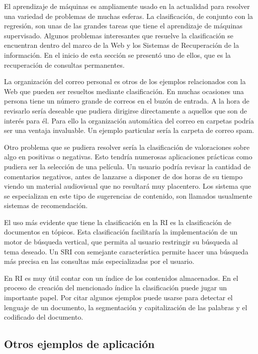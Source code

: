 \documentclass{llncs}
\begin{document}
	{\tiny 	El aprendizaje de m\'aquinas es ampliamente usado en la actualidad para resolver una variedad de problemas de muchas esferas. La clasificaci\'on, de conjunto con la regresi\'on, son unas de las grandes tareas que tiene el aprendizaje de m\'aquinas supervisado. Algunos problemas interesantes que resuelve la clasificaci\'on se encuentran dentro del marco de la Web y los Sistemas de Recuperaci\'on de la informaci\'on. En el inicio de esta secci\'on se present\'o uno de ellos, que es la recuperaci\'on de consultas permanentes.
		
		La organizaci\'on del correo personal es otros de los ejemplos relacionados con la Web que pueden ser resueltos mediante clasificaci\'on. En muchas ocasiones una persona tiene un n\'umero grande de correos en el buz\'on de entrada. A la hora de revisarlo ser\'ia deseable que pudiera dirigirse directamente a aquellos que son de inter\'es para \'el. Para ello la organizaci\'on autom\'atica del correo en carpetas podr\'ia ser una ventaja invaluable. Un ejemplo particular ser\'ia la carpeta de correo spam.
		
		Otro problema que se pudiera resolver ser\'ia la clasificaci\'on de valoraciones sobre algo en positivas o negativas. Esto tendr\'ia numerosas aplicaciones pr\'acticas como pudiera ser la selecci\'on de una pel\'icula. Un usuario podr\'ia revisar la cantidad de comentarios negativos, antes de lanzarse a disponer de dos horas de su tiempo viendo un material audiovisual que no resultar\'a muy placentero. Los sistema que se especializan en este tipo de sugerencias de contenido, son llamados usualmente sistemas de recomendaci\'on.
		
		El uso m\'as evidente que tiene la clasificaci\'on en la RI es la clasificaci\'on de documentos en t\'opicos. Esta clasificaci\'on facilitar\'ia la implementaci\'on de un motor de b\'usqueda vertical, que permita al usuario restringir su b\'usqueda al tema deseado. Un SRI con semejante caracter\'istica permite hacer una b\'usqueda m\'as precisa en las consultas m\'as especializadas por el usuario.
		
		En RI es muy \'util contar con un \'indice de los contenidos almacenados. En el proceso de creaci\'on del mencionado \'indice la clasificaci\'on puede jugar un importante papel. Por citar algunos ejemplos puede usarse para detectar el lenguaje de un documento, la segmentaci\'on y capitalizaci\'on de las palabras y el codificado del documento.
		}

	\subsection{Otros ejemplos de aplicaci\'on}
\end{document}

